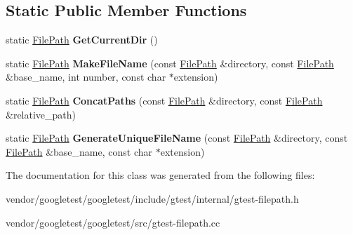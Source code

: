 \subsection*{Static Public Member Functions}
\begin{DoxyCompactItemize}
\item 
\mbox{\label{classtesting_1_1internal_1_1_file_path_aaff39ccd7bfb7a1c09c0220a64326387}} 
static \mbox{\hyperlink{classtesting_1_1internal_1_1_file_path}{File\+Path}} {\bfseries Get\+Current\+Dir} ()
\item 
\mbox{\label{classtesting_1_1internal_1_1_file_path_aa8c102da670261eb4fa8e2f2481df139}} 
static \mbox{\hyperlink{classtesting_1_1internal_1_1_file_path}{File\+Path}} {\bfseries Make\+File\+Name} (const \mbox{\hyperlink{classtesting_1_1internal_1_1_file_path}{File\+Path}} \&directory, const \mbox{\hyperlink{classtesting_1_1internal_1_1_file_path}{File\+Path}} \&base\+\_\+name, int number, const char $\ast$extension)
\item 
\mbox{\label{classtesting_1_1internal_1_1_file_path_ac9d57987f60ac43f0c57b89e333e531e}} 
static \mbox{\hyperlink{classtesting_1_1internal_1_1_file_path}{File\+Path}} {\bfseries Concat\+Paths} (const \mbox{\hyperlink{classtesting_1_1internal_1_1_file_path}{File\+Path}} \&directory, const \mbox{\hyperlink{classtesting_1_1internal_1_1_file_path}{File\+Path}} \&relative\+\_\+path)
\item 
\mbox{\label{classtesting_1_1internal_1_1_file_path_a2280a77adb394cf80bb5f73fc292e8c8}} 
static \mbox{\hyperlink{classtesting_1_1internal_1_1_file_path}{File\+Path}} {\bfseries Generate\+Unique\+File\+Name} (const \mbox{\hyperlink{classtesting_1_1internal_1_1_file_path}{File\+Path}} \&directory, const \mbox{\hyperlink{classtesting_1_1internal_1_1_file_path}{File\+Path}} \&base\+\_\+name, const char $\ast$extension)
\end{DoxyCompactItemize}


The documentation for this class was generated from the following files\+:\begin{DoxyCompactItemize}
\item 
vendor/googletest/googletest/include/gtest/internal/gtest-\/filepath.\+h\item 
vendor/googletest/googletest/src/gtest-\/filepath.\+cc\end{DoxyCompactItemize}
